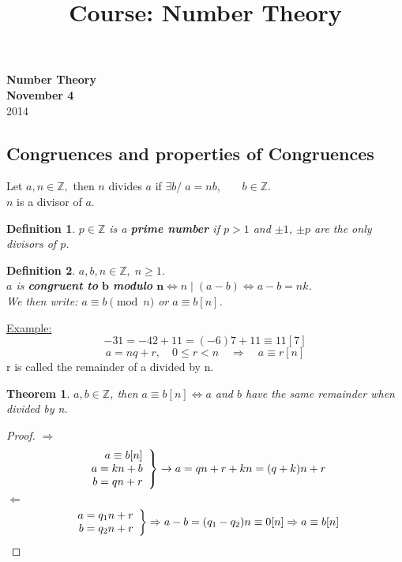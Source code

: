 \documentclass{report}
\title{Course: Number Theory}
\begin{document}
\newtheorem*{defi}{Definition}
\newtheorem*{thm}{Theorem}

{\centering
\Large
\textbf{Number Theory}\\
\normalsize
\textbf{November 4}\\
2014\\
}
\vspace{5mm}
\subsection*{Congruences and properties of Congruences}
Let $a,n \in \mathbb{Z},$ then $n$ divides $a$ if $\exists b/\; a=nb$,$\qquad b \in \mathbb{Z}$.\\
$n$ is a divisor of $a$.
\begin{defi} $p \in \mathbb{Z}$ is a \textbf{prime number} if $p > 1$ and $\pm1$, $\pm p$ are the only divisors of $p$.
\end{defi}
\begin{defi} $a,b,n \in \mathbb{Z}, \; n\geq 1$. \\
$a$ is \textbf{congruent to} $\textbf{b}$ \textbf{modulo} $\textbf{n} \iff n \mid (a-b) \iff a-b=nk$.\\
We then write: $a\equiv b \pmod n$ or $a \equiv b [n]$.
\end{defi}
\underline{Example:}
\[
-31 = -42+11=(-6)7 +11\equiv 11[7]
\]
\[
a=nq+r,\quad 0 \leq r<n \quad \Rightarrow \quad a \equiv r [n]
\]
r is called the remainder of a divided by n.

\begin{thm} $a,b \in \mathbb{Z}$, then $a \equiv b[n] \iff a$ and $b$ have the same remainder when divided by n.
\end{thm}
\begin{proof}
\underline{$\Rightarrow$}
\[
\left.
\begin{array}{r r r}
a \equiv b[n]\\
a=kn+b\\
b=qn+r\\
\end{array}
\right\}
\rightarrow a=qn+r+kn=(q+k)n+r
\]
\underline{$\Leftarrow$}
\[
\left.
\begin{array}{r r r}
a=q_1n+r\\
b=q_2n+r\\
\end{array}
\right \} \Rightarrow a-b=(q_1-q_2)n\equiv0[n] \Rightarrow a\equiv b[n]
\]
\end{proof}
\end{document}
